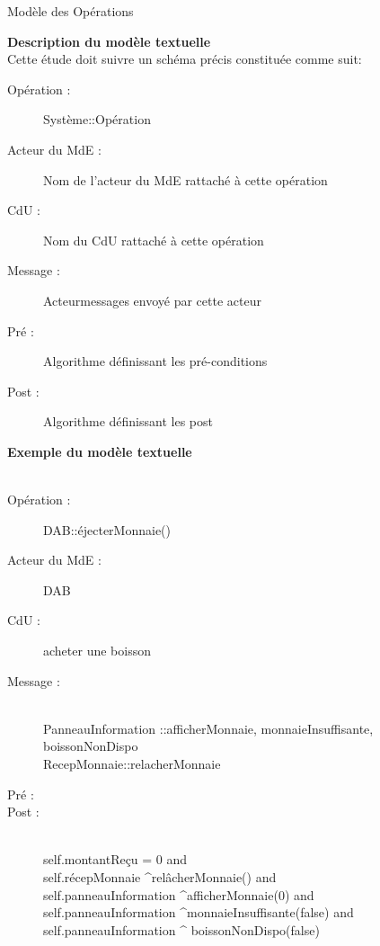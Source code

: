 \begin{LQ}{Modèle des Opérations}



\textbf{Description du modèle textuelle}\\
Cette étude doit suivre un schéma précis constituée comme suit:
 \\
\begin{description}
\item[Opération :] Système::Opération
\item[Acteur du MdE :] Nom de l’acteur du MdE rattaché à cette opération
\item[CdU :] Nom du CdU rattaché à cette opération
\item[Message :] Acteur{messages envoyé par cette acteur}
\item[Pré :] Algorithme définissant les pré-conditions
\item[Post :] Algorithme définissant les post
\end{description}

\textbf{Exemple du modèle textuelle}\\
 \\
\begin{description}
\item[Opération :]  DAB::éjecterMonnaie() 
\item[Acteur du MdE :] DAB
\item[CdU :] acheter une boisson

\item[Message :] \\
\>PanneauInformation ::{afficherMonnaie, monnaieInsuffisante, boissonNonDispo}\\
\>RecepMonnaie::{relacherMonnaie}

\item[Pré :] 
\item[Post :] \\
	\>self.montantReçu = 0 and\\
	\>self.récepMonnaie ^relâcherMonnaie() and\\
	\>self.panneauInformation ^afficherMonnaie(0) and\\
	\>self.panneauInformation ^monnaieInsuffisante(false) and\\
	\>self.panneauInformation ^ boissonNonDispo(false) 

\end{description}



\end{LQ}
